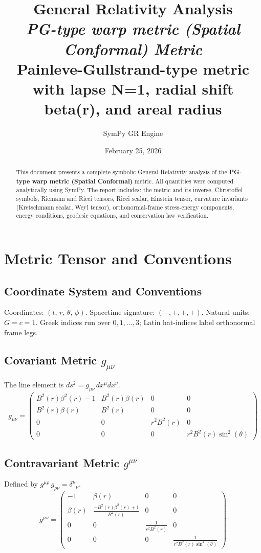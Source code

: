 \documentclass[11pt,a4paper]{article}
\title{%
  \textbf{General Relativity Analysis} \\[0.6em]
  \large\textit{PG-type warp metric (Spatial Conformal) Metric} \\[0.3em]
  \normalsize Painleve-Gullstrand-type metric with lapse N=1, radial shift beta(r), and areal radius
}
\author{SymPy GR Engine}
\date{February 25, 2026}
\begin{document}
\allowdisplaybreaks
\maketitle
\tableofcontents
\newpage

\begin{abstract}
\sloppy
This document presents a complete symbolic General Relativity analysis of the \textbf{PG-type warp metric (Spatial Conformal)} metric. All quantities were computed analytically using SymPy. The report includes: the metric and its inverse, Christoffel symbols, Riemann and Ricci tensors, Ricci scalar, Einstein tensor, curvature invariants (Kretschmann scalar, Weyl tensor), orthonormal-frame stress-energy components, energy conditions, geodesic equations, and conservation law verification.
\end{abstract}
\newpage
\section{Metric Tensor and Conventions}
\subsection{Coordinate System and Conventions}
Coordinates: $(t,\,r,\,\theta,\,\phi)$. Spacetime signature: $(-,+,+,+)$. Natural units: $G = c = 1$. Greek indices run over $0,1,\ldots,3$; Latin hat-indices label orthonormal frame legs.
\subsection{Covariant Metric $g_{\mu\nu}$}
The line element is $ds^2 = g_{\mu\nu}\,dx^\mu dx^\nu$.
\begin{equation}
  g_{\mu\nu} = \begin{pmatrix}
    B^{2}{\left(r \right)} \beta^{2}{\left(r \right)} - 1 & B^{2}{\left(r \right)} \beta{\left(r \right)} & 0 & 0 \\
    B^{2}{\left(r \right)} \beta{\left(r \right)} & B^{2}{\left(r \right)} & 0 & 0 \\
    0 & 0 & r^{2} B^{2}{\left(r \right)} & 0 \\
    0 & 0 & 0 & r^{2} B^{2}{\left(r \right)} \sin^{2}{\left(\theta \right)}
\end{pmatrix}
\end{equation}
\subsection{Contravariant Metric $g^{\mu\nu}$}
Defined by $g^{\mu\rho}\,g_{\rho\nu} = \delta^\mu{}_\nu$.
\begin{equation}
  g^{\mu\nu} = \begin{pmatrix}
    -1 & \beta{\left(r \right)} & 0 & 0 \\
    \beta{\left(r \right)} & \frac{- B^{2}{\left(r \right)} \beta^{2}{\left(r \right)} + 1}{B^{2}{\left(r \right)}} & 0 & 0 \\
    0 & 0 & \frac{1}{r^{2} B^{2}{\left(r \right)}} & 0 \\
    0 & 0 & 0 & \frac{1}{r^{2} B^{2}{\left(r \right)} \sin^{2}{\left(\theta \right)}}
\end{pmatrix}
\end{equation}
\end{document}
